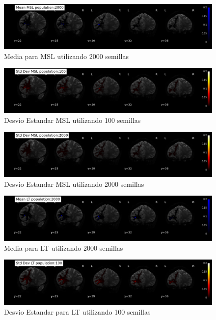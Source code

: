 \begin{figure}[h!]
   \centering
    \includegraphics[width=\textwidth]{img/msl_all_mean.png}
    \caption{Media para MSL utilizando 2000 semillas}
    \label{fig:mmean}
\end{figure}

\begin{figure}[h!]
   \centering
    \includegraphics[width=\textwidth]{img/msl_allstd1.png}
    \caption{Desvio Estandar MSL utilizando 100 semillas}
    \label{fig:mstd1}
\end{figure}

\begin{figure}[h!]
   \centering
    \includegraphics[width=\textwidth]{img/msl_allstd2.png}
    \caption{Desvio Estandar MSL utilizando 2000 semillas}
    \label{fig:mstd2}
\end{figure}

\begin{figure}[h!]
   \centering
    \includegraphics[width=\textwidth]{img/lt_all_mean.png}
    \caption{Media para LT utilizando 2000 semillas}
    \label{fig:lmean}
\end{figure}

\begin{figure}[h!]
   \centering
    \includegraphics[width=\textwidth]{img/lt_allstd1.png}
    \caption{Desvio Estandar para LT utilizando 100 semillas}
    \label{fig:lstd1}
\end{figure}

